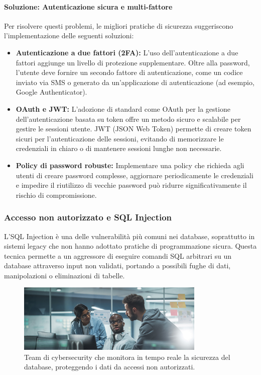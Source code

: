 \paragraph{Soluzione: Autenticazione sicura e multi-fattore}
Per risolvere questi problemi, le migliori pratiche di sicurezza suggeriscono l'implementazione delle seguenti soluzioni:
\begin{itemize}
    \item \textbf{Autenticazione a due fattori (2FA):} L'uso dell'autenticazione a due fattori aggiunge un livello di protezione supplementare. Oltre alla password, l'utente deve fornire un secondo fattore di autenticazione, come un codice inviato via SMS o generato da un'applicazione di autenticazione (ad esempio, Google Authenticator).
    \item \textbf{OAuth e JWT:} L'adozione di standard come OAuth per la gestione dell'autenticazione basata su token offre un metodo sicuro e scalabile per gestire le sessioni utente. JWT (JSON Web Token) permette di creare token sicuri per l'autenticazione delle sessioni, evitando di memorizzare le credenziali in chiaro o di mantenere sessioni lunghe non necessarie.
    \item \textbf{Policy di password robuste:} Implementare una policy che richieda agli utenti di creare password complesse, aggiornare periodicamente le credenziali e impedire il riutilizzo di vecchie password può ridurre significativamente il rischio di compromissione.
\end{itemize}

\subsubsection{Accesso non autorizzato e SQL Injection}
L'SQL Injection è una delle vulnerabilità più comuni nei database, soprattutto in sistemi legacy che non hanno adottato pratiche di programmazione sicura. Questa tecnica permette a un aggressore di eseguire comandi SQL arbitrari su un database attraverso input non validati, portando a possibili fughe di dati, manipolazioni o eliminazioni di tabelle.

\begin{figure}[h]
    \centering
    \includegraphics[width=0.8\textwidth]{sources/cybersecurity-team.jpg} %
    \caption{Team di cybersecurity che monitora in tempo reale la sicurezza del database, proteggendo i dati da accessi non autorizzati.}
    \label{fig:team_cybersecurity_monitoraggio}
\end{figure}


